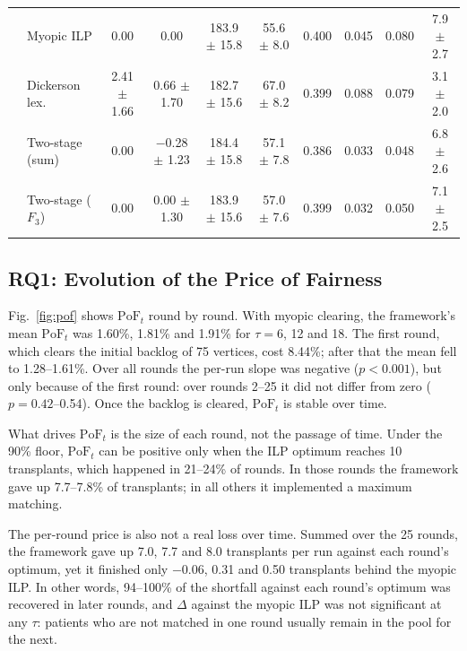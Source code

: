 \documentclass[journal]{IEEEtran}
\newcommand{\pof}{\ensuremath{\mathrm{PoF}_t}}
\begin{document}
\begin{table}[!t]
\begin{tabular}{@{}cl cccccccc@{}}
 & Myopic ILP         & 0.00            & 0.00              & 183.9 $\pm$ 15.8 & 55.6 $\pm$ 8.0 & 0.400 & 0.045 & 0.080 & 7.9 $\pm$ 2.7 \\
 & Dickerson lex.     & 2.41 $\pm$ 1.66 & 0.66 $\pm$ 1.70   & 182.7 $\pm$ 15.6 & 67.0 $\pm$ 8.2 & 0.399 & 0.088 & 0.079 & 3.1 $\pm$ 2.0 \\
 & Two-stage (sum)    & 0.00            & $-$0.28 $\pm$ 1.23 & 184.4 $\pm$ 15.8 & 57.1 $\pm$ 7.8 & 0.386 & 0.033 & 0.048 & 6.8 $\pm$ 2.6 \\
 & Two-stage ($F_3$)  & 0.00            & 0.00 $\pm$ 1.30   & 183.9 $\pm$ 15.6 & 57.0 $\pm$ 7.6 & 0.399 & 0.032 & 0.050 & 7.1 $\pm$ 2.5 \\
\bottomrule
\end{tabular}
\end{table}

\subsection{RQ1: Evolution of the Price of Fairness}
\label{sec:results:rq1}

Fig.~\ref{fig:pof} shows $\pof$ round by round. With myopic clearing,
the framework's mean $\pof$ was 1.60\%, 1.81\% and 1.91\% for
$\tau = 6$, 12 and 18. The first round, which clears the initial
backlog of 75 vertices, cost 8.44\%; after that the mean fell to
1.28--1.61\%. Over all rounds the per-run slope was negative
($p < 0.001$), but only because of the first round: over rounds 2--25
it did not differ from zero ($p = 0.42$--0.54). Once the backlog is
cleared, $\pof$ is stable over time.

What drives $\pof$ is the size of each round, not the passage of
time. Under the 90\% floor, $\pof$ can be positive only when the ILP
optimum reaches 10 transplants, which happened in 21--24\% of rounds.
In those rounds the framework gave up 7.7--7.8\% of transplants; in
all others it implemented a maximum matching.

The per-round price is also not a real loss over time. Summed over
the 25 rounds, the framework gave up 7.0, 7.7 and 8.0 transplants per
run against each round's optimum, yet it finished only $-0.06$, 0.31
and 0.50 transplants behind the myopic ILP. In other words,
94--100\% of the shortfall against each round's optimum was recovered
in later rounds, and $\Delta$ against the myopic ILP was not
significant at any $\tau$: patients who are not matched in one round
usually remain in the pool for the next.
\end{document}
